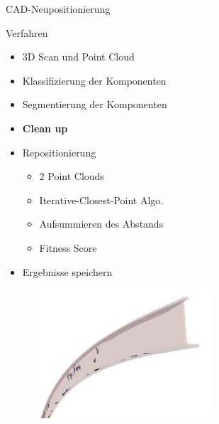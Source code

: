 \begin{frame}{CAD-Neupositionierung}
    \begin{minipage}[]{0.49\textwidth}
    \begin{block}{Verfahren}
        \begin{itemize}
            \item 3D Scan und Point Cloud
            \item Klassifizierung der Komponenten
            \item Segmentierung der Komponenten
            \item \textbf{Clean up}
            \item Repositionierung
            \begin{itemize}
                \item 2 Point Clouds
                \item Iterative-Closest-Point Algo.
                \item Aufsummieren des Abstands
                \item Fitness Score
            \end{itemize}
            \item Ergebnisse speichern
        \end{itemize}
    \end{block}
    \end{minipage}
    \begin{minipage}[]{0.49\textwidth}
      \begin{figure}
          \includegraphics[width=190pt]{img_niklas/clean_up_after.jpg}
          \label{fig:my_label}
      \end{figure}
    \end{minipage}
\end{frame}


